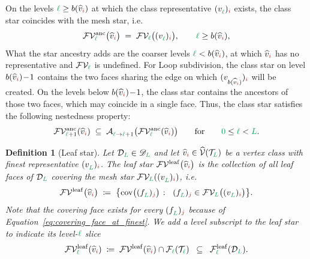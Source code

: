 \documentclass[a4paper, 12pt]{article}
\makeatletter
\newcommand{\green}{\color{ForestGreen}}
\newcommand{\brickred}{\color{BrickRed}}
\newcommand{\T}{\mathcal{T}}
\newcommand{\V}{\mathcal{V}}
\newcommand{\F}{\mathcal{F}}
\newcommand{\vertex}[2]{\freeQ{v}{}{#1}{#2}}
\newcommand{\vertexClass}[1]{\widehat{v}_{#1}}
\newcommand{\vertexClasses}{\widehat{\V}}
\newcommand{\face}[2]{\freeQ{f}{}{#1}{#2}}
\newcommand{\FVl}[1]{\F\V_{#1}}
\newcommand{\coarseIdxone}{{\brickred i}}
\newcommand{\fineIdxone}{{\brickred j}}
\renewcommand{\l}{{\green\ell}}
\renewcommand{\L}{{\green L}}
\newcommand{\lzero}{{\green 0}}
\newcommand{\freeQ}[4]{ ( {#1}^{#2}_{#3} )_{#4}}
\newcommand{\Aop}[3]{\mathcal{A}^{#1}_{{#2} \to {#3}}}
\newtheorem{definition}[theorem]{Definition}
\theoremstyle{definition}
\theoremstyle{plain}
\numberwithin{equation}{section}
\DeclareRobustCommand{\domseq}[1][]{\mathcal{D}\ifx\@empty#1\@empty\else_{#1}\fi}
\newcommand{\alldomseqs}{\mathscr{D}}
\newcommand{\birthLevel}{b}
\newcommand{\leafF}[1]{\F^{\mathrm{leaf}}_{#1}}             %
\newcommand{\coveringFace}{\mathrm{cov}}                    %
\newcommand{\FVleaf}[1]{\F\V^{\mathrm{leaf}}_{#1}}          %
\newcommand{\FVanc}[1]{\F\V^{\mathrm{anc}}_{#1}}            %
\makeatother
\begin{document}
On the levels $\l \geq \birthLevel(\vertexClass{\coarseIdxone})$ at which the class representative $\vertex{\l}{\coarseIdxone}$ exists, the class star coincides with the mesh star, i.e.
\begin{equation}
    \label{eq:star_ancestry_is_star}
    \FVanc{\l} \big( \vertexClass{\coarseIdxone} \big) \; = \; \FVl{\l} \big( \vertex{\l}{\coarseIdxone} \big), \qquad \l \geq \birthLevel(\vertexClass{\coarseIdxone}),
\end{equation}
What the star ancestry adds are the coarser levels $\l < \birthLevel(\vertexClass{\coarseIdxone})$, at which $\vertexClass{\coarseIdxone}$ has no representative and $\FVl{\l}$ is undefined. For Loop subdivision, the class star on level $\birthLevel(\vertexClass{\coarseIdxone}) \! - \! 1$ contains the two faces sharing the edge on which $\vertex{\birthLevel(\vertexClass{\coarseIdxone})}{\coarseIdxone}$ will be created. On the levels below $\birthLevel(\vertexClass{\coarseIdxone}) \! - \! 1$, the class star contains the ancestors of those two faces, which may coincide in a single face. Thus, the class star satisfies the following nestedness property:
\begin{equation}
    \label{eq:star_ancestry_nested}
    \FVanc{\l+1} ( \vertexClass{\coarseIdxone} ) \; \subseteq \; \Aop{}{\l}{\l+1} \big( \FVanc{\l} ( \vertexClass{\coarseIdxone} ) \big) \qquad \text{for} \qquad \lzero \leq \l < \L.
\end{equation}

\begin{definition}[Leaf star]
    \label{def:leaf_star}
    Let $\domseq[\L] \in \alldomseqs_\L$ and let $\vertexClass{\coarseIdxone} \in \vertexClasses(\T_\L)$ be a vertex class with finest representative $\vertex{\L}{\coarseIdxone}$. The \emph{leaf star} $\FVleaf{} \big( \vertexClass{\coarseIdxone} \big)$ is the collection of all leaf faces of $\domseq[\L]$ covering the mesh star $\FVl{\L}(\vertex{\L}{\coarseIdxone})$, i.e.
    \begin{equation}
        \label{eq:leaf_star}
        \FVleaf{} \big( \vertexClass{\coarseIdxone} \big) \; \coloneq \; \big\{ \coveringFace \big( \face{\L}{\fineIdxone} \big) \; \colon \;\; \face{\L}{\fineIdxone} \in \FVl{\L} \big( \vertex{\L}{\coarseIdxone} \big) \big\}.
    \end{equation}
    Note that the covering face exists for every $\face{\L}{\fineIdxone}$ because of Equation~\eqref{eq:covering_face_at_finest}. We add a level subscript to the leaf star to indicate its \emph{level-$\l$ slice}
    \begin{equation}
        \label{eq:leaf_star_slice}
        \FVleaf{\l} ( \vertexClass{\coarseIdxone} ) \; \coloneq \; \FVleaf{} ( \vertexClass{\coarseIdxone} ) \cap \F_\l(\T_\l) \;\; \subseteq \;\; \leafF{\l}(\domseq[\L]).
    \end{equation}
\end{definition}
\end{document}
